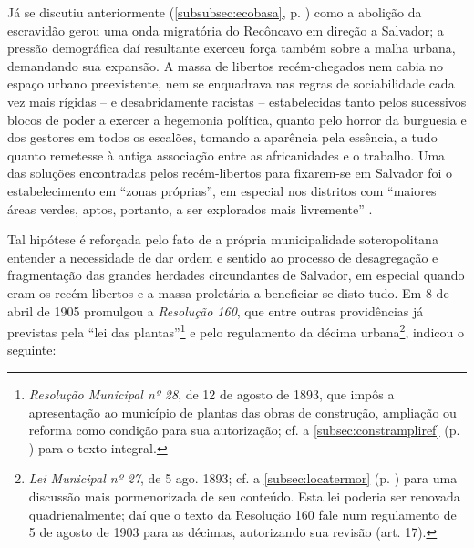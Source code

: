 Já se discutiu anteriormente (\autoref{subsubsec:ecobasa}, p. \pageref{subsubsec:ecobasa}) como a abolição da escravidão gerou uma onda migratória do Recôncavo em direção a Salvador; a pressão demográfica daí resultante exerceu força também sobre a malha urbana, demandando sua expansão. A massa de libertos recém-chegados nem cabia no espaço urbano preexistente, nem se enquadrava nas regras de sociabilidade cada vez mais rígidas -- e desabridamente racistas -- estabelecidas tanto pelos sucessivos blocos de poder a exercer a hegemonia política, quanto pelo horror da burguesia e dos gestores em todos os escalões, tomando a aparência pela essência, a tudo quanto remetesse à antiga associação entre as africanidades e o trabalho. Uma das soluções encontradas pelos recém-libertos para fixarem-se em Salvador foi o estabelecimento em ``zonas próprias'', em especial nos distritos com ``maiores áreas verdes, aptos, portanto, a ser explorados mais livremente'' \cite{santos_habitacao_1990}. 

Tal hipótese é reforçada pelo fato de a própria municipalidade soteropolitana entender a necessidade de dar ordem e sentido ao processo de desagregação e fragmentação das grandes herdades circundantes de Salvador, em especial quando eram os recém-libertos e a massa proletária a beneficiar-se disto tudo. Em 8 de abril de 1905 promulgou a \textit{Resolução 160}, que entre outras providências já previstas pela ``lei das plantas''\footnote{\textit{Resolução Municipal nº 28}, de 12 de agosto de 1893, que impôs a apresentação ao município de plantas das obras de construção, ampliação ou reforma como condição para sua autorização; cf. a \autoref{subsec:constrampliref} (p. \pageref{subsec:constrampliref}) para o texto integral.} e pelo regulamento da décima urbana\footnote{\textit{Lei Municipal nº 27}, de 5 ago. 1893; cf. a \autoref{subsec:locatermor} (p. \pageref{subsec:locatermor}) para uma discussão mais pormenorizada de seu conteúdo. Esta lei poderia ser renovada quadrienalmente; daí que o texto da Resolução 160 fale num regulamento de 5 de agosto de 1903 para as décimas, autorizando sua revisão (art. 17).}, indicou o seguinte:

